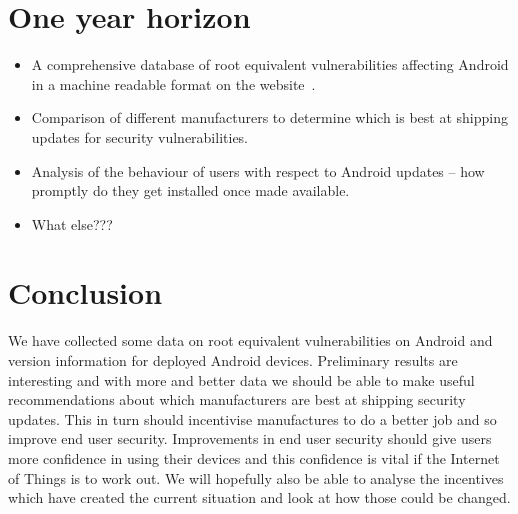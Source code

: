 \documentclass[a4paper,twocolumn]{article}
\begin{document}
\section*{One year horizon}
\begin{itemize}
 \item A comprehensive database of root equivalent vulnerabilities affecting Android in a machine readable format on the website~\cite{androidvulnerabilities.org}.
 \item Comparison of different manufacturers to determine which is best at shipping updates for security vulnerabilities.
 \item Analysis of the behaviour of users with respect to Android updates -- how promptly do they get installed once made available.
 \item What else???
\end{itemize}


\section*{Conclusion}
We have collected some data on root equivalent vulnerabilities on Android and version information for deployed Android devices.
Preliminary results are interesting and with more and better data we should be able to make useful recommendations about which manufacturers are best at shipping security updates.
This in turn should incentivise manufactures to do a better job and so improve end user security.
Improvements in end user security should give users more confidence in using their devices and this confidence is vital if the Internet of Things is to work out.
We will hopefully also be able to analyse the incentives which have created the current situation and look at how those could be changed.


\printbibliography
\end{document}

